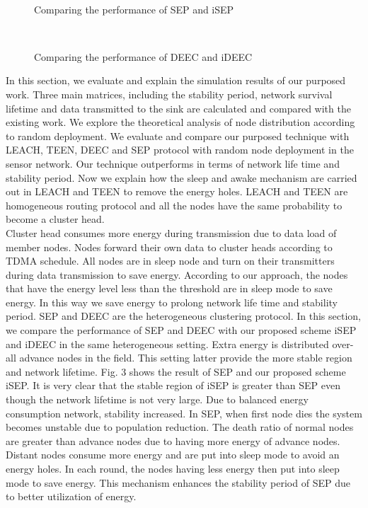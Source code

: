 \documentclass{article}
\begin{document}
\begin{figure}
\centering
\mbox{\quad
{}}
\caption{Comparing the performance of SEP and iSEP} \label{fig12}
\end{figure}
\begin{figure}
\centering
\mbox{\quad
{}}
\caption{Comparing the performance of DEEC and iDEEC} \label{fig12}
\end{figure}
In this section, we evaluate and explain the simulation results of our purposed work. Three main matrices, including the stability period, network survival lifetime and data transmitted to the sink are calculated and compared with the existing work. We explore the theoretical analysis of node distribution according to random deployment. We evaluate and compare our purposed technique with LEACH, TEEN, DEEC and SEP protocol with random node deployment in the sensor network. Our technique outperforms in terms of network life time and stability period. Now we explain how the sleep and awake mechanism are carried out in LEACH and TEEN to remove the energy holes. LEACH and TEEN are homogeneous routing protocol and all the nodes have the same probability to become a cluster head. \\Cluster head consumes more energy during transmission due to data load of member nodes. Nodes forward their own data to cluster heads according to TDMA schedule. All nodes are in sleep node and turn on their transmitters during data transmission to save energy. According to our approach, the nodes that have the energy level less than the threshold are in sleep mode to save energy. In this way we save energy to prolong network life time and stability period.
SEP and DEEC are the heterogeneous clustering protocol. In this section, we compare the performance of SEP and DEEC with our proposed scheme iSEP and iDEEC in the same heterogeneous setting. Extra energy is distributed over-all advance nodes in the field. This setting latter provide the more stable region and network lifetime. Fig. 3 shows the result of SEP and our proposed scheme iSEP. It is very clear that the stable region of iSEP is greater than SEP even though the network lifetime is not very large. Due to balanced energy consumption network, stability increased. In SEP, when first node dies the system becomes unstable due to population reduction. The death ratio of normal nodes are greater than advance nodes due to having more energy of advance nodes. Distant nodes consume more energy and are put into sleep mode to avoid an energy holes. In each round, the nodes having less energy then  put into sleep mode to save energy. This mechanism enhances the stability period of SEP due to better utilization of energy.
\end{document}
